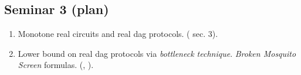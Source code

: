 \subsection{Seminar 3 (plan)}

\begin{enumerate}
    \item Monotone real circuits and real dag protocols. (\cite{HruPud17} sec. 3).
    \item Lower bound on real dag protocols via \textit{bottleneck technique}. \textit{Broken Mosquito
        Screen} formulas. (\cite{HakCook99}, \cite{Sok17}).
\end{enumerate}